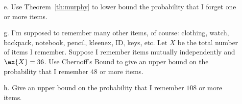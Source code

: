 \documentclass[12pt]{article}
\begin{document}
\begin{itemize}
\item[e.] Use Theorem~\ref{th:murphy} to lower bound the probability that I forget
one or more items.

\item[g.] 
I'm supposed to remember many other items, of course: clothing,
watch, backpack, notebook, pencil, kleenex, ID, keys, etc.  Let $X$ be
the total number of items I remember.  Suppose I remember items
mutually independently and $\ex{X} = 36$.
Use Chernoff's Bound to give an upper bound on the probability that I remember 48 or
more items.


\item[h.] Give an upper bound on the probability that I remember $108$ or
more items.


\end{itemize}
\end{document}
